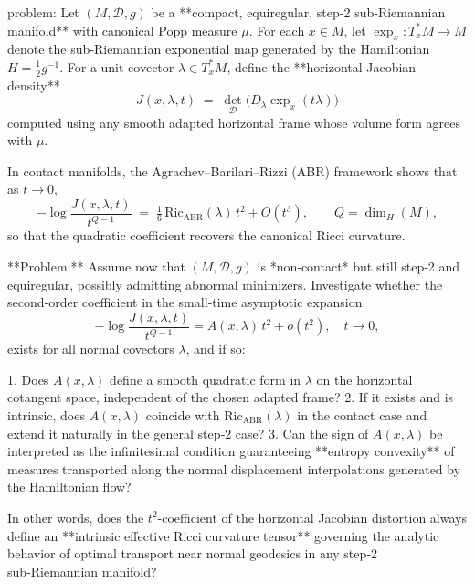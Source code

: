 problem:  
Let \((M,\mathcal{D},g)\) be a **compact, equiregular, step‑2 sub‑Riemannian manifold** with canonical Popp measure \(\mu\).  
For each \(x\in M\), let \(\exp_x:T_x^*M\to M\) denote the sub‑Riemannian exponential map generated by the Hamiltonian \(H=\tfrac12 g^{-1}\).  For a unit covector \(\lambda\in T_x^*M\), define the **horizontal Jacobian density**
\[
J(x,\lambda,t)\;=\;\det_{\mathcal D}\!\big(D_\lambda\exp_x(t\lambda)\big)
\]
computed using any smooth adapted horizontal frame whose volume form agrees with \(\mu\).  

In contact manifolds, the Agrachev–Barilari–Rizzi (ABR) framework shows that as \(t\to0\),
\[
-\log\frac{J(x,\lambda,t)}{t^{Q-1}} \;=\; \tfrac16\,\mathrm{Ric}_{\mathrm{ABR}}(\lambda)\,t^2+O(t^3),
\qquad Q=\dim_H(M),
\]
so that the quadratic coefficient recovers the canonical Ricci curvature.  

**Problem:**  
Assume now that \((M,\mathcal{D},g)\) is *non‑contact* but still step‑2 and equiregular, possibly admitting abnormal minimizers.  
Investigate whether the second‑order coefficient in the small‑time asymptotic expansion  
\[
-\log\frac{J(x,\lambda,t)}{t^{Q-1}}
     = A(x,\lambda)\,t^2 + o(t^2), \quad t\to0,
\]
exists for all normal covectors \(\lambda\), and if so:

1. Does \(A(x,\lambda)\) define a smooth quadratic form in \(\lambda\) on the horizontal cotangent space, independent of the chosen adapted frame?  
2. If it exists and is intrinsic, does \(A(x,\lambda)\) coincide with \(\mathrm{Ric}_{\mathrm{ABR}}(\lambda)\) in the contact case and extend it naturally in the general step‑2 case?  
3. Can the sign of \(A(x,\lambda)\) be interpreted as the infinitesimal condition guaranteeing **entropy convexity** of measures transported along the normal displacement interpolations generated by the Hamiltonian flow?

In other words, does the \(t^2\)-coefficient of the horizontal Jacobian distortion always define an **intrinsic effective Ricci curvature tensor** governing the analytic behavior of optimal transport near normal geodesics in any step‑2 sub‑Riemannian manifold?

